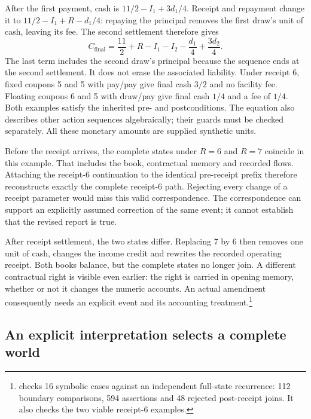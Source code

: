 After the first payment, cash is $11/2-I_1+3d_1/4$. Receipt and repayment change it to $11/2-I_1+R-d_1/4$: repaying the principal removes the first draw's unit of cash, leaving its fee. The second settlement therefore gives
\begin{equation}
 C_{\mathrm{final}}=\frac{11}{2}+R-I_1-I_2-\frac{d_1}{4}+\frac{3d_2}{4}.
 \label{eq:receipt-world-cash}
\end{equation}
The last term includes the second draw's principal because the sequence ends at the second settlement. It does not erase the associated liability. Under receipt 6, fixed coupons 5 and 5 with pay/pay give final cash $3/2$ and no facility fee. Floating coupons 6 and 5 with draw/pay give final cash $1/4$ and a fee of $1/4$. Both examples satisfy the inherited pre- and postconditions. The equation also describes other action sequences algebraically; their guards must be checked separately. All these monetary amounts are supplied synthetic units.

Before the receipt arrives, the complete states under $R=6$ and $R=7$ coincide in this example. That includes the book, contractual memory and recorded flows. Attaching the receipt-6 continuation to the identical pre-receipt prefix therefore reconstructs exactly the complete receipt-6 path. Rejecting every change of a receipt parameter would miss this valid correspondence. The correspondence can support an explicitly assumed correction of the same event; it cannot establish that the revised report is true.

After receipt settlement, the two states differ. Replacing 7 by 6 then removes one unit of cash, changes the income credit and rewrites the recorded operating receipt. Both books balance, but the complete states no longer join. A different contractual right is visible even earlier: the right is carried in opening memory, whether or not it changes the numeric accounts. An actual amendment consequently needs an explicit event and its accounting treatment.\footnote{ checks 16 symbolic cases against an independent full-state recurrence: 112 boundary comparisons, 594 assertions and 48 rejected post-receipt joins. It also checks the two viable receipt-6 examples.}

\subsection{An explicit interpretation selects a complete world}

